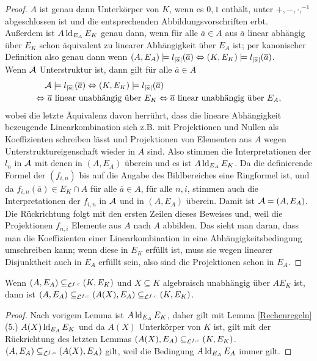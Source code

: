     \begin{proof}
    	$A$ ist genau dann Unterkörper von $K$, wenn es $0,1$ enthält, unter $+,-,\cdot,^{-1}$ abgeschlossen ist und die entsprechenden Abbildungsvorschriften erbt.\\
    	Außerdem ist $A\operatorname{ld}_{E_A}E_K$ genau dann, wenn für alle $\overline{a}\in A$ aus $\overline{a}$ linear abhängig über $E_K$ schon äquivalent zu linearer Abhängigkeit über $E_A$ ist; per kanonischer Definition also genau dann wenn $(A,E_A)\models l_{{\left| \overline{a} \right|}}(\overline{a}) \Leftrightarrow (K,E_K)\models l_{{\left| \overline{a} \right|}}(\overline{a})$.\\
    	Wenn $\mathcal{A}$ Unterstruktur ist, dann gilt für alle $\overline{a}\in A$
    	\begin{align*}
    	&\mathcal{A}\models l_{{\left| \overline{a} \right|}}(\overline{a})\Leftrightarrow(K,E_K)\models l_{{\left| \overline{a} \right|}}(\overline{a})\\
    	\Leftrightarrow&\ \overline{a}\text{ linear unabhängig über }E_K\Leftrightarrow\overline{a}\text{ linear unabhängig über }E_A,
    	\end{align*}
    	wobei die letzte Äquivalenz davon herrührt, dass die lineare Abhängigkeit bezeugende Linearkombination sich z.B. mit Projektionen und Nullen als Koeffizienten schreiben lässt und Projektionen von Elementen aus $A$ wegen Unterstruktureigenschaft wieder in $A$ sind. Also stimmen die Interpretationen der $l_n$ in $\mathcal{A}$ mit denen in $(A,E_A)$ überein und es ist $A\operatorname{ld}_{E_A}E_K$. Da die definierende Formel der $(f_{i,n})$ bis auf die Angabe des Bildbereiches eine Ringformel ist, und da $f_{i,n}(\overline{a})\in E_K\cap A$ für alle $\overline{a}\in A$, für alle $n,i$, stimmen auch die Interpretationen der $f_{i,n}$ in $\mathcal{A}$ und in $(A,E_A)$ überein. Damit ist $\mathcal{A}=(A,E_A)$.\\
    	Die Rückrichtung folgt mit den ersten Zeilen dieses Beweises und, weil die Projektionen $f_{n,i}$ Elemente aus $A$ nach $A$ abbilden. Das sieht man daran, dass man die Koeffizienten einer Linearkombination in eine Abhängigkeitsbedingung umschreiben kann; wenn diese in $E_K$ erfüllt ist, muss sie wegen linearer Disjunktheit auch in $E_A$ erfüllt sein, also sind die Projektionen schon in $E_A$.
    \end{proof}
    
    \begin{lemma}\label{transz Erw}
    	Wenn $(A,E_A)\subseteq_{\mathcal{L}^{f,c}}(K,E_K)$ und $X\subseteq K$ algebraisch unabhängig über $AE_K$ ist, dann ist $(A,E_A)\subseteq_{\mathcal{L}^{f,c}}(A(X),E_A)\subseteq_{\mathcal{L}^{f,c}}(K,E_K)$.
    \end{lemma}
    \begin{proof}
    	Nach vorigem Lemma ist $A\operatorname{ld}_{E_A}E_K$, daher gilt mit Lemma \ref{Rechenregeln} (5.) $A(X)\operatorname{ld}_{E_A}E_K$ und da $A(X)$ Unterkörper von $K$ ist, gilt mit der Rückrichtung des letzten Lemmas $(A(X),E_A)\subseteq_{\mathcal{L}^{f,c}}(K,E_K)$.\\
    	$(A,E_A)\subseteq_{\mathcal{L}^{f,c}}(A(X),E_A)$ gilt, weil die Bedingung $A\operatorname{ld}_{E_A} E_A$ immer gilt.
    \end{proof}
    
